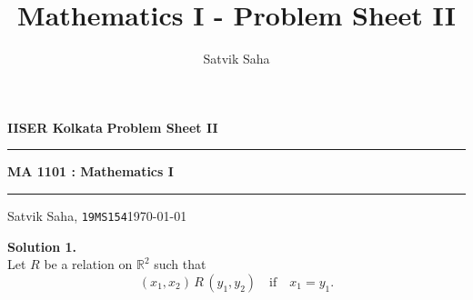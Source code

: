 \documentclass[10pt]{article}
\title{Mathematics I - Problem Sheet II}
\author{Satvik Saha}
\date{}
\begin{document}
        \par\textbf{IISER Kolkata} \hfill \textbf{Problem Sheet II}
        \vspace{3pt}
        \hrule
        \vspace{3pt}
        \begin{center}
                \LARGE{\textbf{MA 1101 : Mathematics I}}
        \end{center}
        \vspace{3pt}
        \hrule
        \vspace{3pt}
        Satvik Saha, \texttt{19MS154}\hfill\today
        \vspace{20pt}

        \textbf{Solution 1.}\\
        Let $R$ be a relation on $\mathbb{R}^2$ such that
        \[(x_1, x_2)\,R\,(y_1, y_2) \quad\text{if}\quad x_1 = y_1.\]
\end{document}
